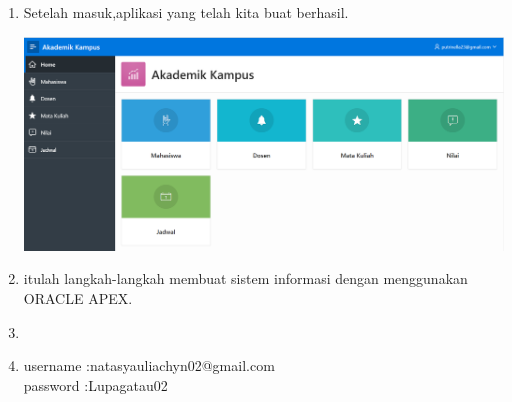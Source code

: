 \documentclass{article}
\begin{document}
\begin{enumerate}
    \item Setelah masuk,aplikasi yang telah kita buat berhasil.
    \begin{center}
    \includegraphics[width=.8\textwidth]{figure/38.PNG}
\end{center}
  
    \item itulah langkah-langkah membuat sistem informasi dengan menggunakan ORACLE APEX.
    \item \usepackage{https://apex.oracle.com/pls/apex/f?p=4550:1:730071682676699:::::} 
    \item username :natasyauliachyn02@gmail.com\\
          password :Lupagatau02
\end{enumerate}
\end{document}
